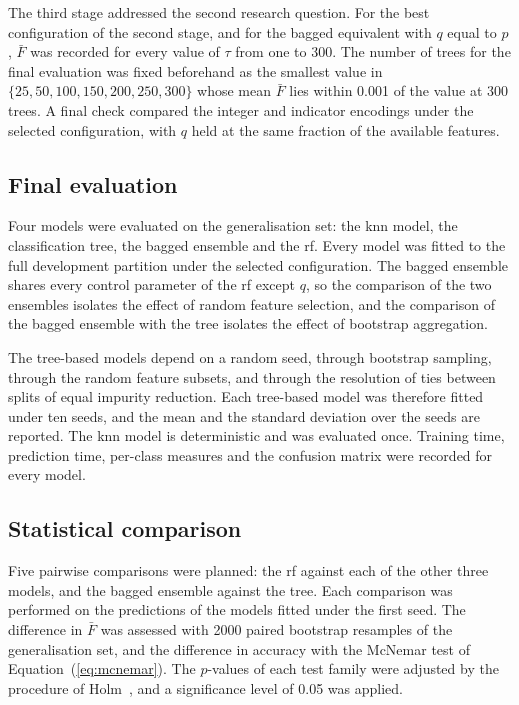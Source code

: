 The third stage addressed the second research question. For the best
configuration of the second stage, and for the bagged equivalent with $q$
equal to $p$, $\bar{F}$ was recorded for every value of $\tau$ from one to
300. The number of trees for the final evaluation was fixed beforehand as
the smallest value in $\{25, 50, 100, 150, 200, 250, 300\}$ whose mean
$\bar{F}$ lies within 0.001 of the value at 300 trees. A final check
compared the integer and indicator encodings under the selected
configuration, with $q$ held at the same fraction of the available features.

\subsection{Final evaluation}
\label{sec:final-protocol}

Four models were evaluated on the generalisation set: the \gls{knn} model,
the classification tree, the bagged ensemble and the \gls{rf}. Every model
was fitted to the full development partition under the selected
configuration. The bagged ensemble shares every control parameter of the
\gls{rf} except $q$, so the comparison of the two ensembles isolates the
effect of random feature selection, and the comparison of the bagged
ensemble with the tree isolates the effect of bootstrap aggregation.

The tree-based models depend on a random seed, through bootstrap sampling,
through the random feature subsets, and through the resolution of ties
between splits of equal impurity reduction. Each tree-based model was
therefore fitted under ten seeds, and the mean and the standard deviation
over the seeds are reported. The \gls{knn} model is deterministic and was
evaluated once. Training time, prediction time, per-class measures and the
confusion matrix were recorded for every model.

\subsection{Statistical comparison}
\label{sec:stats-protocol}

Five pairwise comparisons were planned: the \gls{rf} against each of the
other three models, and the bagged ensemble against the tree. Each
comparison was performed on the predictions of the models fitted under the
first seed. The difference in $\bar{F}$ was assessed with \num{2000}
paired bootstrap resamples of the generalisation set, and the difference in
accuracy with the McNemar test of Equation~(\ref{eq:mcnemar}). The
$p$-values of each test family were adjusted by the procedure of
Holm~\cite{holm1979}, and a significance level of 0.05 was applied.


